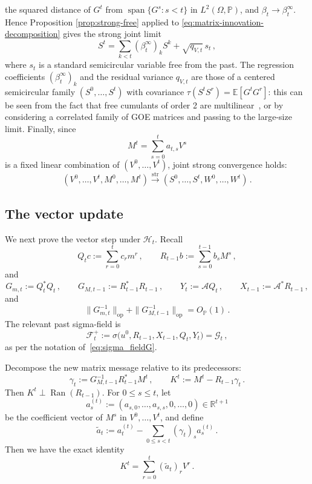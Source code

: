 \documentclass[11pt]{article}
\theoremstyle{definition}
\theoremstyle{remark}
\numberwithin{equation}{section}
\numberwithin{theorem}{section}
\newcommand{\R}{\mathbb R}
\newcommand{\E}{\mathbb E}
\newcommand{\Prob}{\mathbb P}
\newcommand{\Span}{\operatorname{span}}
\newcommand{\op}{\mathrm{op}}
\newcommand{\taup}{\tau}
\newcommand{\cA}{\mathcal A}
\newcommand{\xto}{\xrightarrow}
\begin{document}
the squared distance of $G^t$ from $\Span\{G^s: s< t\}$ in $L^2(\Omega,\Prob)$, and $\beta_t\to\beta_t^\infty$.  Hence Proposition \ref{prop:strong-free} applied to \eqref{eq:matrix-innovation-decomposition} gives the strong joint limit
\[
  S^t=\sum_{k<t}(\beta_t^\infty)_kS^k+\sqrt{q_{V,t}}\,s_t\,,
\]
where $s_t$ is a standard semicircular variable free from the past. The regression coefficients $(\beta_t^\infty)_k$ and the residual variance $q_{V,t}$ are those of a centered semicircular family  $(S^0,\ldots,S^t)$ with covariance $\taup(S^tS^r)=\E[G^tG^r]$: this can be seen from the fact that free cumulants of order 2 are multilinear~\cite{mingo2017free}, or by considering a correlated family of GOE matrices and passing to the large-size limit.      
%
Finally, since
\[
  M^t=\sum_{s=0}^t a_{t,s} V^{s}
\]
is a fixed linear combination of $(V^0,\ldots,V^t)$,  joint strong convergence holds:
\[
  (V^0,\ldots,V^t,M^0,\ldots,M^t)
  \xto{\mathrm{str}}
  (S^0,\ldots,S^t,W^0,\ldots,W^t)\,.
\]


\subsection{The vector update}\label{sec:vector-update-detailed}

We next prove the vector step under $\mathcal{H}_{t}$.  Recall
\[
  Q_tc:=\sum_{r=0}^tc_rm^r\,,
  \qquad
  R_{t-1}b:=\sum_{s=0}^{t-1}b_sM^s\,,
\]
and
\[
  G_{m,t}:=Q_t^*Q_t\,,
  \qquad
  G_{M,t-1}:=R_{t-1}^*R_{t-1}\,,
  \qquad
  Y_t:=\cA Q_t\,,
  \qquad
  X_{t-1}:=\cA ^*R_{t-1}\,,
\]
and
\[
 \|G_{m,t}^{-1}\|_{\op}
 +\|G_{M,t-1}^{-1}\|_{\op}=O_{\Prob}(1)\,.
\]
The relevant past sigma-field is
\begin{equation}\label{eq:past-plus}
  \mathcal F_t^+:= \sigma\bigl(u^0,R_{t-1},X_{t-1},Q_t,Y_t\bigr) = \mathscr{G}_{t}\,, %
\end{equation}
as per the notation of~\eqref{eq:sigma_fieldG}.

Decompose the new matrix message relative to its predecessors:
\begin{equation}\label{eq:gamma-k-def}
  \gamma_t:=G_{M,t-1}^{-1}R_{t-1}^*M^t\,,
  \qquad
  K^t:=M^t-R_{t-1}\gamma_t\,.
\end{equation}
Then $K^t\perp\operatorname{Ran}(R_{t-1})$.  For $0\le s\le t$, let
\[
   a_s^{(t)}
  :=(a_{s,0},\ldots,a_{s,s},0,\ldots,0)\in\R^{t+1}
\]
be the coefficient vector of $M^s$ in $V^0,\ldots,V^t$, and define
\begin{equation}\label{eq:lambda-innovation}
  \widetilde{a}_t
  := a_t^{(t)}
  -\sum_{0\le s<t}(\gamma_t)_s a_s^{(t)}\,.
\end{equation}
Then we have the exact identity
\begin{equation}\label{eq:K-as-V-combination}
  K^t=\sum_{r=0}^t
  (\widetilde{a}_t)_rV^r\,.
\end{equation}
\end{document}

